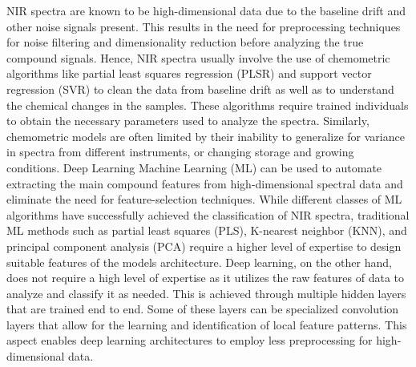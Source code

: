 \documentclass[12pt]{report}
\renewcommand{\cite}{\supercite}
\begin{document}
NIR spectra are known to be high-dimensional data due to the baseline drift and other noise signals present. This results in the need for preprocessing techniques for noise filtering and dimensionality reduction before analyzing the true compound signals.\cite{1DConvolutionalNeuralkrohling2023} Hence,  NIR spectra usually involve the use of chemometric algorithms like partial least squares regression (PLSR) and support vector regression (SVR) to clean the data from baseline drift as well as to understand the chemical changes in the samples.\cite{NIRSpectroscopyCombinedshang2023,LinearSupportVectornaguib2014} These algorithms require trained individuals to obtain the necessary parameters used to analyze the spectra.\cite{QuantitativeAnalysisYeastwang2017} Similarly, chemometric models are often limited by their inability to generalize for variance in spectra from different instruments, or changing storage and growing conditions. Deep Learning\cite{ReviewEvolutionChemometricswalsh2023} Machine Learning (ML) can be used to automate extracting the main compound features from high-dimensional spectral data and eliminate the need for feature-selection techniques. 
While different classes of ML algorithms have successfully achieved the classification of NIR spectra,\cite{1DConvolutionalNeuralkrohling2023} traditional ML methods such as partial least squares (PLS), K-nearest neighbor (KNN), and principal component analysis (PCA) require a higher level of expertise to design suitable features of the models architecture.\cite{zhangReviewMachineLearning2022} Deep learning, on the other hand, does not require a high level of expertise as it utilizes the raw features of data to analyze and classify it as needed. This is achieved through multiple hidden layers that are trained end to end. Some of these layers can be specialized convolution layers that allow for the learning and identification of local feature patterns. This aspect enables deep learning architectures to employ less preprocessing for high-dimensional data.\cite{FastDeepLearningyue2021} 
\end{document}
